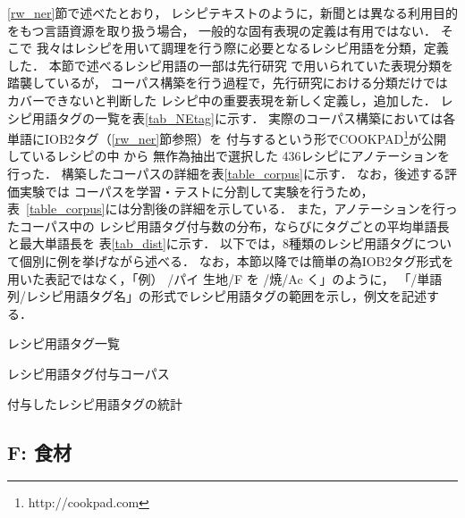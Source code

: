 \documentclass[japanese]{jnlp_1.4}
\begin{document}
\ref{rw_ner}節で述べたとおり，
レシピテキストのように，新聞とは異なる利用目的をもつ言語資源を取り扱う場合，
一般的な固有表現の定義は有用ではない．
そこで
我々はレシピを用いて調理を行う際に必要となるレシピ用語を分類，定義した．
本節で述べるレシピ用語の一部は先行研究
\cite{Structural.Analysis.of.Cooking.Preparation.Steps.in.Japanese}
で用いられていた表現分類を踏襲しているが，
コーパス構築を行う過程で，先行研究における分類だけではカバーできないと判断した
レシピ中の重要表現を新しく定義し，追加した．
レシピ用語タグの一覧を表\ref{tab_NEtag}に示す．
実際のコーパス構築においては各単語にIOB2タグ（\ref{rw_ner}節参照）を
付与するという形でCOOKPAD\footnote{http://cookpad.com}が公開しているレシピの中
から
無作為抽出で選択した
436レシピにアノテーションを行った．
構築したコーパスの詳細を表\ref{table_corpus}に示す．
なお，後述する評価実験では
コーパスを学習・テストに分割して実験を行うため，
表~\ref{table_corpus}には分割後の詳細を示している．
また，アノテーションを行ったコーパス中の
レシピ用語タグ付与数の分布，ならびにタグごとの平均単語長と最大単語長を
表\ref{tab_dist}に示す．
以下では，8種類のレシピ用語タグについて個別に例を挙げながら述べる．
なお，本節以降では簡単の為IOB2タグ形式を用いた表記ではなく，「例） /パイ 生地/F を /焼/Ac く」のように，
「/単語列/レシピ用語タグ名」の形式でレシピ用語タグの範囲を示し，例文を記述する．

\begin{table}[t]
\caption{レシピ用語タグ一覧}
\label{tab_NEtag}

\end{table}
\begin{table}[t]
  \caption{レシピ用語タグ付与コーパス}
  \label{table_corpus}

\end{table}
\begin{table}[t]
\caption{付与したレシピ用語タグの統計}
\label{tab_dist}

\end{table}


\subsection{F: 食材}
\end{document}
